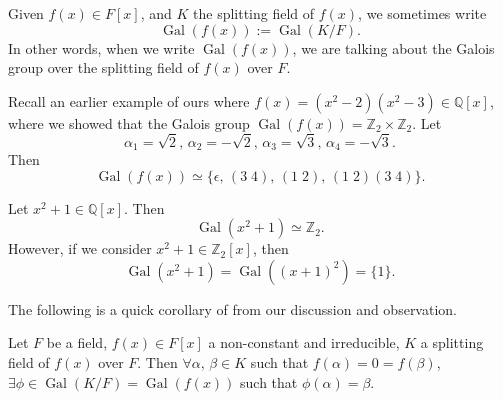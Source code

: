 \documentclass[notoc,notitlepage]{tufte-book}
\DeclareMathOperator{\Gal}{Gal}
\begin{document}
\begin{notation}
  Given $f(x) \in F[x]$, and $K$ the splitting field of $f(x)$, we sometimes
  write
  \begin{equation*}
    \Gal(f(x)) := \Gal(K / F).
  \end{equation*}
  In other words, when we write $\Gal(f(x))$, we are talking about the Galois
  group over the splitting field of $f(x)$ over $F$.
\end{notation}

\begin{eg}
  Recall an earlier example of ours where $f(x) = (x^2 - 2)(x^2 - 3) \in
  \mathbb{Q}[x]$, where we showed that the Galois group $\Gal(f(x)) =
  \mathbb{Z}_2 \times \mathbb{Z}_2$. Let
  \begin{equation*}
    \alpha_1 = \sqrt{2}, \, \alpha_2 = - \sqrt{2}, \, \alpha_3 = \sqrt{3}, \,
    \alpha_4 = - \sqrt{3}.
  \end{equation*}
  Then
  \begin{equation*}
    \Gal(f(x)) \simeq \{ \epsilon, \, (3 \; 4), \, (1 \; 2), \, (1 \; 2)(3 \; 4)
    \}.
  \end{equation*}
\end{eg}

\begin{eg}
  Let $x^2 + 1 \in \mathbb{Q}[x]$. Then 
  \begin{equation*}
    \Gal(x^2 + 1) \simeq \mathbb{Z}_2.
  \end{equation*}
  However, if we consider $x^2 + 1 \in \mathbb{Z}_2[x]$, then
  \begin{equation*}
    \Gal(x^2 + 1) = \Gal((x + 1)^2) = \{ 1 \}.
  \end{equation*}
\end{eg}

The following is a quick corollary of from our discussion and observation.

\begin{crly}\label{crly:the_galois_group_completely_captures_all_permutation_of_the_roots}
  Let $F$ be a field, $f(x) \in F[x]$ a non-constant and irreducible, $K$ a
  splitting field of $f(x)$ over $F$. Then $\forall \alpha, \, \beta \in K$ such
  that $f(\alpha) = 0 = f(\beta)$, $\exists \phi \in \Gal(K / F) = \Gal(f(x))$
  such that $\phi(\alpha) = \beta$.
\end{crly}
\end{document}

